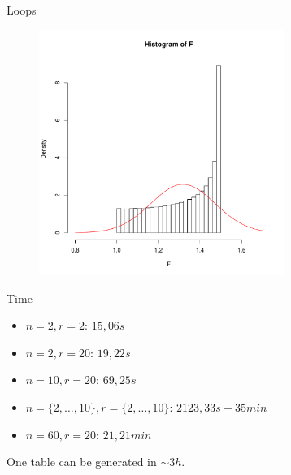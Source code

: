 \documentclass{beamer}
\begin{document}
\begin{frame}{Loops}
\begin{figure}
\begin{overprint}
\centerline{\includegraphics[width=8cm]{Primer_1e+7.pdf}}

\end{overprint}
\end{figure}

\end{frame}

\begin{frame}{Time}
\begin{itemize}
\item $n=2, r=2$: $15,06s$
\item $n=2, r=20$: $19,22s$
\item $n=10,r=20$: $69,25s$
\item $n=\{2,\dots,10\},  r=\{2, \dots,10\}$: $2123,33s -35min$
\item $n=60, r=20$: $21,21min$
\end{itemize}
One table can be generated in $\sim 3h.$
\end{frame}
\end{document}
